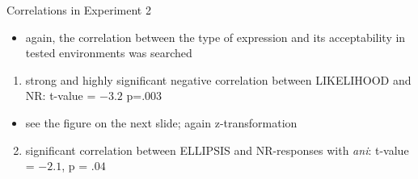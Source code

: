 \documentclass[
  ignorenonframetext,
]{beamer}
\providecommand{\tightlist}{%
  \setlength{\itemsep}{0pt}\setlength{\parskip}{0pt}}\usepackage{longtable,booktabs,array}
\newcommand{\cond}[1]{\textsc{#1}}
\begin{document}
\begin{frame}
\begin{block}{Correlations in Experiment 2}
\protect\hypertarget{correlations-in-experiment-2}{}
\begin{itemize}
\tightlist
\item
  again, the correlation between the type of expression and its
  acceptability in tested environments was searched
\end{itemize}

\begin{enumerate}
\tightlist
\item
  strong and highly significant negative correlation between
  \cond{LIKELIHOOD} and \cond{NR}: t-value = \(−3.2\) p=\(.003\)
\end{enumerate}

\begin{itemize}
\tightlist
\item
  see the figure on the next slide; again z-transformation
\end{itemize}

\begin{enumerate}
\setcounter{enumi}{1}
\tightlist
\item
  significant correlation between \cond{ELLIPSIS} and NR-responses with
  \emph{ani}: t-value = \(−2.1\), p = \(.04\)
\end{enumerate}
\end{block}
\end{frame}
\end{document}
